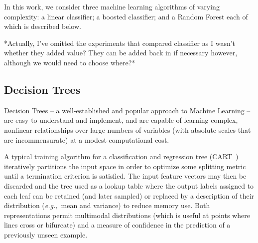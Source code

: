 \documentclass{IEEEtran}
\def\eg{\emph{e.g.,}}
\begin{document}
In this work, we consider three machine learning algorithms of varying complexity: a linear classifier; a boosted classifier; and a Random Forest each of which is described below.

*Actually, I've omitted the experiments that compared classifier as I wasn't whether they added value? They can be added back in if necessary however, although we would need to choose where?*

%

%


\subsection{Decision Trees}
\label{s:learning_trees}

Decision Trees -- a well-established and popular approach to Machine Learning -- are easy to understand and implement, and are capable of learning complex, nonlinear relationships over large numbers of variables (with absolute scales that are incommensurate) at a modest computational cost.

A typical training algorithm for a classification and regression tree (CART~\cite{}) iteratively partitions the input space in order to optimize some splitting metric until a termination criterion is satisfied. The input feature vectors may then be discarded and the tree used as a lookup table where the output labels assigned to each leaf can be retained (and later sampled) or replaced by a description of their distribution (\eg~mean and variance) to reduce memory use. Both representations permit multimodal distributions (which is useful at points where lines cross or bifurcate) and a measure of confidence in the prediction of a previously unseen example.
\end{document}
